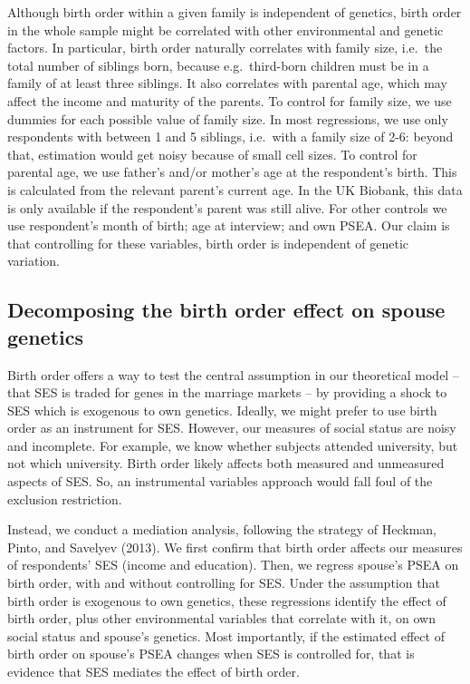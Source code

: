 \documentclass[
  12pt,
]{article}
\theoremstyle{definition}
\theoremstyle{definition}
\theoremstyle{definition}
\theoremstyle{definition}
\theoremstyle{remark}
\begin{document}
Although birth order within a given family is
independent of genetics, birth order in the whole sample might be correlated with
other environmental and genetic factors. In particular, birth order naturally
correlates with family size, i.e.~the total number of siblings born, because
e.g.~third-born children must be in a family of at least three siblings. It
also correlates with parental age, which may affect the income and
maturity of the parents. To control for family size, we use dummies for
each possible value of family size. In most regressions, we use only
respondents with between 1 and 5 siblings, i.e.~with a family size of
2-6: beyond that, estimation would get noisy because of small cell sizes.
To control for parental age, we use father's and/or mother's age at the
respondent's birth. This is calculated from the relevant
parent's current age. In the UK Biobank, this data is only available if the
respondent's parent was still alive. For other controls we use respondent's
month of birth; age at interview; and own PSEA. Our claim is that controlling
for these variables, birth order is independent of genetic variation.

\hypertarget{decomposing-the-birth-order-effect-on-spouse-genetics}{%
\subsection{Decomposing the birth order effect on spouse genetics}\label{decomposing-the-birth-order-effect-on-spouse-genetics}}

Birth order offers a way to test the central assumption in our theoretical model -- that SES is traded for genes in the marriage markets -- by providing a shock to SES
which is exogenous to own genetics. Ideally, we might prefer to use birth order
as an instrument for SES. However, our measures of social status are noisy and
incomplete. For example, we know whether subjects attended university, but not
which university. Birth order likely affects both measured and unmeasured aspects
of SES. So, an instrumental variables approach would fall foul of the exclusion
restriction.

Instead, we conduct a mediation analysis, following the strategy of
Heckman, Pinto, and Savelyev (2013). We first confirm that birth order affects our
measures of respondents' SES (income and education). Then, we regress spouse's
PSEA on birth order, with and without controlling for SES. Under the assumption
that birth order is exogenous to own genetics, these regressions identify the
effect of birth order, plus other environmental variables that correlate with
it, on own social status and spouse's genetics. Most importantly, if the
estimated effect of birth order on spouse's PSEA changes when SES is controlled
for, that is evidence that SES mediates the effect of birth order.
\end{document}
